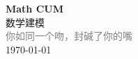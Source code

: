 \vspace*{\fill}
\begin{center}
    \textcolor{orange!50}{\Huge\textbf{Math CUM}} \\[1em]
    \textcolor{orange!60!pink}{\Large 数学建模} \\[2em]
    \textcolor{gray}{\large 你如同一个吻，封碱了你的嘴} \\[1em]
    \today
\end{center}
\vspace*{\fill}
\clearpage


\clearpage
% 
